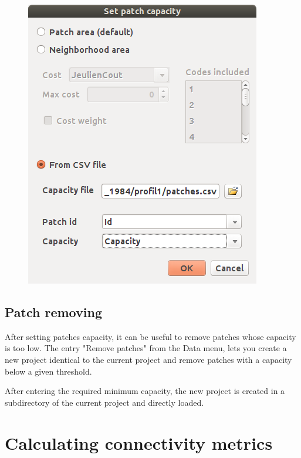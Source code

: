 \documentclass{article}
\begin{document}
\begin{figure}[H]
	\includegraphics[scale=0.5]{img/manual-en_img9.png}
\end{figure}

\subsection{Patch removing}

After setting patches capacity, it can be useful to remove patches whose capacity is too low. The entry "Remove patches" from the Data menu, lets you create a new project identical to the current project and remove patches with a capacity below a given threshold.

After entering the required minimum capacity, the new project is created in a subdirectory of the current project and directly loaded.


\section{Calculating connectivity metrics}
\end{document}
